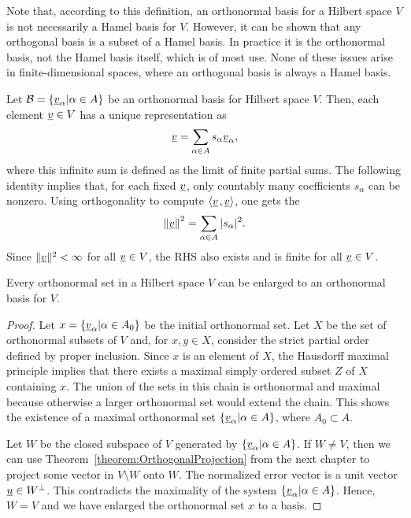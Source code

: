 Note that, according to this definition, an orthonormal basis for a Hilbert space $V$ is not necessarily a Hamel basis for $V$.
However, it can be shown that any orthogonal basis is a subset of a Hamel basis.
In practice it is the orthonormal basis, not the Hamel basis itself, which is of most use.
None of these issues arise in finite-dimensional spaces, where an orthogonal basis is always a Hamel basis.

Let $\mathcal{B} = \left\{ \underline{v}_{\alpha} | \alpha \in A \right\}$ be an orthonormal basis for Hilbert space $V$.
Then, each element $\underline{v} \in V$ has a unique representation as
\begin{equation*}
\underline{v} = \sum_{\alpha \in A} s_{\alpha} \underline{v}_{\alpha},
\end{equation*}
where this infinite sum is defined as the limit of finite partial sums.
The following identity implies that, for each fixed $\underline v$, only countably many coefficients $s_\alpha$ can be nonzero.
Using orthogonality to compute ${\left\langle  \underline{v}  \mskip2mu ,  \underline{v}  \right\rangle}$, one gets the 
\begin{equation*}
\left\| \underline{v} \right\|^2 = \sum_{\alpha \in A} | s_{\alpha} |^2.
\end{equation*}
Since $\| \underline{v} \|^2 < \infty$ for all $\underline{v} \in V$, the RHS also exists and is finite for all $\underline{v} \in V$.

\begin{theorem}
Every orthonormal set in a Hilbert space $V$ can be enlarged to an orthonormal basis for $V$.
\end{theorem}
\begin{proof}
Let $x = \left\{ \underline{v}_{\alpha} | \alpha \in A_0 \right\}$ be the initial orthonormal set.
Let $X$ be the set of orthonormal subsets of $V$ and, for $x, y \in X$, consider the strict partial order defined by proper inclusion.
Since $x$ is an element of $X$, the Hausdorff maximal principle implies that there exists a maximal simply ordered subset $Z$ of $X$ containing $x$.
The union of the sets in this chain is orthonormal and maximal because otherwise a larger orthonormal set would extend the chain.
This shows the existence of a maximal orthonormal set $\left\{ \underline{v}_{\alpha} | \alpha \in A \right\}$, where $A_0 \subset A$.

Let $W$ be the closed subspace of $V$ generated by $\left\{ \underline{v}_{\alpha} | \alpha \in A \right\}$.
If $W \neq V$, then we can use Theorem~\ref{theorem:OrthogonalProjection} from the next chapter to project some vector in $V \setminus W$ onto $W$.
The normalized error vector is a unit vector $\underline{u} \in W^{\bot}$.
This contradicts the maximality of the system $\left\{ \underline{v}_{\alpha} | \alpha \in A \right\}$.
Hence, $W = V$ and we have enlarged the orthonormal set $x$ to a basis.
\end{proof}

